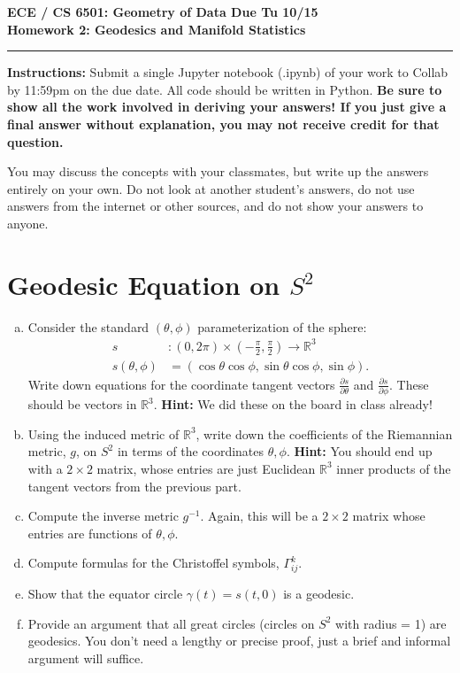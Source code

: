 \documentclass[11pt]{article}
\begin{document}
\thispagestyle{empty}
{\large{\bf ECE / CS 6501: Geometry of Data \hfill Due Tu 10/15}}\\

{\LARGE{\bf Homework 2: Geodesics and Manifold Statistics}}
\vspace{0.2\baselineskip}
\hrule

{\bf Instructions:} Submit a single Jupyter notebook (.ipynb) of your work to
Collab by 11:59pm on the due date. All code should be written in Python. {\bf Be
  sure to show all the work involved in deriving your answers! If you just give
  a final answer without explanation, you may not receive credit for that
  question.}

You may discuss the concepts with your classmates, but write up the answers
entirely on your own. Do not look at another student's answers, do not use
answers from the internet or other sources, and do not show your answers to
anyone.

\section{Geodesic Equation on $S^2$}
\begin{enumerate}[(a)]
\item Consider the standard $(\theta, \phi)$ parameterization of the sphere:
  \begin{align*}
    s &: (0, 2 \pi) \times \left(-\frac{\pi}{2}, \frac{\pi}{2}\right) \rightarrow \mathbb{R}^3\\
    s(\theta, \phi) &= (\cos \theta \cos \phi, \sin \theta \cos \phi, \sin \phi).
  \end{align*}
  Write down equations for the coordinate tangent vectors
  $\frac{\partial s}{\partial \theta}$ and $\frac{\partial s}{\partial
    \phi}$. These should be vectors in $\mathbb{R}^3$. {\bf Hint:} We did these
  on the board in class already!

\item Using the induced metric of $\mathbb{R}^3$, write down the coefficients of
  the Riemannian metric, $g$, on $S^2$ in terms of the coordinates
  $\theta, \phi$. {\bf Hint:} You should end up with a $2 \times 2$ matrix,
  whose entries are just Euclidean $\mathbb{R}^3$ inner products of the tangent
  vectors from the previous part.

\item Compute the inverse metric $g^{-1}$. Again, this will be a $2 \times 2$
  matrix whose entries are functions of $\theta, \phi$.

\item Compute formulas for the Christoffel symbols, $\Gamma_{ij}^k$.

\item Show that the equator circle $\gamma(t) = s(t, 0)$ is a geodesic.

\item Provide an argument that all great circles (circles on $S^2$ with radius =
  1) are geodesics. You don't need a lengthy or precise proof, just a brief and
  informal argument will suffice.
  
\end{enumerate}
\end{document}
